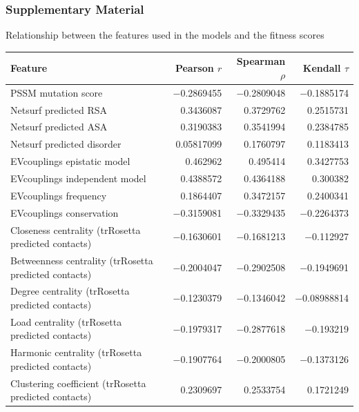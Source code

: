 \documentclass[10pt, british, luatex]{beamer}
\begin{document}
\begin{frame}
	\frametitle{Supplementary Material}
	Relationship between the features used in the models and the fitness scores

	\tiny%
	\begin{tabular*}{\linewidth}{@{\extracolsep{\fill}}lrrr}%
		\toprule
		Feature                                                  & Pearson $r$      & Spearman $\rho$  & Kendall $\tau$    \\
		\midrule
		PSSM mutation score                                      & \num{-0.2869455} & \num{-0.2809048} & \num{-0.1885174}  \\
		Netsurf predicted RSA                                    & \num{0.3436087}  & \num{0.3729762}  & \num{0.2515731}   \\
		Netsurf predicted ASA                                    & \num{0.3190383}  & \num{0.3541994}  & \num{0.2384785}   \\
		Netsurf predicted disorder                               & \num{0.05817099} & \num{0.1760797}  & \num{0.1183413}   \\
		EVcouplings epistatic model                              & \num{0.462962}   & \num{0.495414}   & \num{0.3427753}   \\
		EVcouplings independent model                            & \num{0.4388572}  & \num{0.4364188}  & \num{0.300382}    \\
		EVcouplings frequency                                    & \num{0.1864407}  & \num{0.3472157}  & \num{0.2400341}   \\
		EVcouplings conservation                                 & \num{-0.3159081} & \num{-0.3329435} & \num{-0.2264373}  \\
		Closeness centrality (trRosetta predicted contacts)      & \num{-0.1630601} & \num{-0.1681213} & \num{-0.112927}   \\
		Betweenness centrality (trRosetta predicted contacts)    & \num{-0.2004047} & \num{-0.2902508} & \num{-0.1949691}  \\
		Degree centrality (trRosetta predicted contacts)         & \num{-0.1230379} & \num{-0.1346042} & \num{-0.08988814} \\
		Load centrality (trRosetta predicted contacts)           & \num{-0.1979317} & \num{-0.2877618} & \num{-0.193219}   \\
		Harmonic centrality (trRosetta predicted contacts)       & \num{-0.1907764} & \num{-0.2000805} & \num{-0.1373126}  \\
		Clustering coefficient (trRosetta predicted contacts)    & \num{0.2309697}  & \num{0.2533754}  & \num{0.1721249}   \\

\end{tabular*}
\end{frame}
\end{document}
